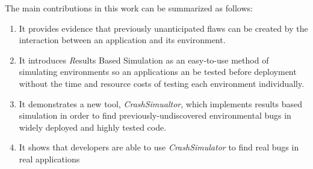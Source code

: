 The main contributions in this work can be summarized as follows:

\begin{enumerate}

\item{It provides evidence
that previously unanticipated flaws can be created by the interaction
between an application and its environment.}

\item{It introduces {\textit Results Based Simulation}
as an easy-to-use method of simulating environments
so an applications an be tested before deployment
without the time and resource costs of
testing each environment individually.}

\item{It demonstrates a new tool, {\em CrashSimualtor},
which implements results based simulation
in order to find previously-undiscovered environmental bugs
in widely deployed and highly tested code.}

\item{It shows that developers are able
to use {\em CrashSimulator}
to find real bugs in real applications}

\end{enumerate}
